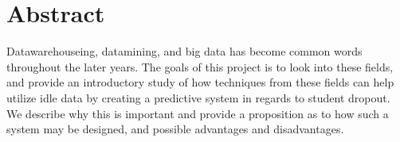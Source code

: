 \section*{Abstract}
	Datawarehouseing, datamining, and big data has become common words throughout the later years. 
	The goals of this project is to look into these fields, and provide an introductory study of how
	techniques from these fields can help utilize idle data by creating a predictive system in regards to student dropout. 
	We describe why this is important and provide a proposition as to how such a system may be designed, and possible
	advantages and disadvantages.
	